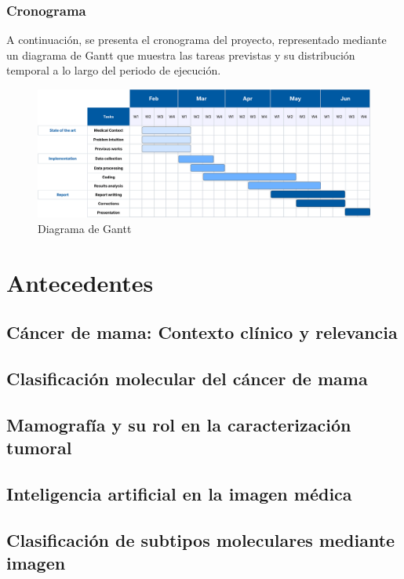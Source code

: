 \documentclass[a4paper,10pt]{book}
\begin{document}
\subsection{Cronograma}

A continuación, se presenta el cronograma del proyecto, representado mediante un diagrama de Gantt que muestra las tareas previstas y su distribución temporal a lo largo del periodo de ejecución.

\begin{figure}[h!]
	\centering
	\includegraphics[width=1\linewidth]{reports//assets/RoadmapV3.png}
	\caption{Diagrama de Gantt}
	\label{fig:roadmap}
\end{figure}




\chapter{Antecedentes}

\section{Cáncer de mama: Contexto clínico y relevancia}
\section{Clasificación molecular del cáncer de mama}
\section{Mamografía y su rol en la caracterización tumoral}
\section{Inteligencia artificial en la imagen médica}
\section{Clasificación de subtipos moleculares mediante imagen}
\end{document}

